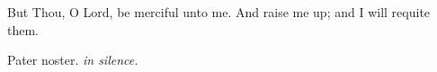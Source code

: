 ﻿%
\def\matinsnocturn{2nd Nocturn}
%
\large
\def\nogloriapatri{T}
{
\def\preant{\setgrefactor{17}\large}
\def\anttranslation{Be ye lifted up, ye everlasting doors, and the King of glory shall come in.}
\def\psalmtranslationsmall{T}
\def\prepsalm{\normalsize\greblockcustos}
\def\lalinebreakaftersix{T}
}%
\printseparation
{
\def\preant{\setgrefactor{17}\large}
\def\prepsalm{\normalsize}
\def\psalmtranslationsmall{T}
\def\anttranslation{I believe to see the good things of the Lord in the land of the living.}
}%
\printseparation
{
\def\preant{\setgrefactor{17}\large}
\def\prepsalm{\normalsize\greblockcustos}
\def\psalmtranslationsmall{T}
\def\anttranslation{O Lord, Thou hast brought up my soul from the grave.}
}

\bigskip
{}
{But Thou, O Lord, be merciful unto me.}
{And raise me up; and I will requite them.}

\bigskip
Pater noster. \emph{in silence.}

